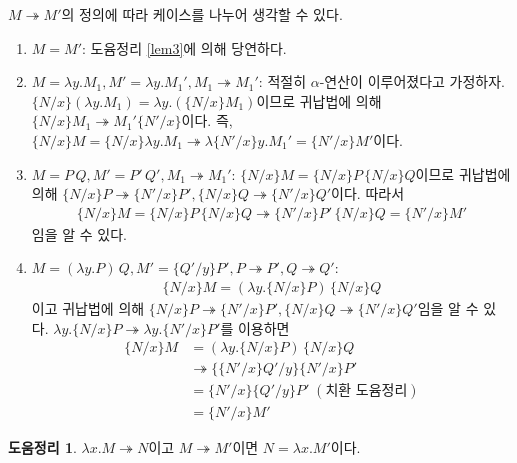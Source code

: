 \documentclass[b5paper, 11pt]{book}
\theoremstyle{definition}
\newtheorem{lem}[defn]{도움정리}
\newenvironment{pf*}{\pushQED{\qed}\pf}
{\popQED\endpf}
\begin{document}
\begin{pf*}
    $M \twoheadrightarrow M'$의 정의에 따라 케이스를 나누어 생각할 수 있다.
    \begin{enumerate}
        \item $M = M'$: 도윰정리 \ref{lem3}에 의해 당연하다.
        \item $M = \lambda y. M_1, M' = \lambda y. M_1', M_1 \twoheadrightarrow M_1'$: 적절히 $\alpha$-연산이 이루어졌다고 가정하자. $ \{N / x\}(\lambda y. M_1) = 
        \lambda y. (\{N / x\} M_1)$이므로 귀납법에 의해 $\{ N / x \} M_1 \twoheadrightarrow M_1' \{N' / x\}$이다.
        즉, $\{N / x\} M = \{N / x \} \lambda y. M_1 \twoheadrightarrow \lambda \{N' / x\} y. M_1' = \{N' / x\} M' $이다.
        \item $ M = P \, Q, M' = P' \, Q', M_1 \twoheadrightarrow M_1' $:
        $ \{N / x\}M = \{N / x \} P \, \{N / x\} Q$이므로 귀납법에 의해 $\{N / x\} P 
    \twoheadrightarrow \{N' / x \} P', \{N / x \} Q \twoheadrightarrow \{N' / x \} Q'$이다. 따라서 
        \begin{align*}
            \{N / x \} M = \{N / x \} P \, \{N / x\} Q
            \twoheadrightarrow \{N' / x \} P' \,  \{N / x \} Q
            = \{N' / x \} M'
        \end{align*} 임을 알 수 있다.
        \item $M = (\lambda y. P) \, Q, M' = \{Q' / y\} P' , P \twoheadrightarrow P' , Q \twoheadrightarrow Q'$:
        \begin{align*}
            \{N / x \} M = (\lambda y. \{N /x \} P) \, \{N /x \} Q 
        \end{align*}
        이고 귀납법에 의해 $ \{N / x\} P \twoheadrightarrow \{N' / x \} P', 
        \{N / x\} Q \twoheadrightarrow \{N' / x \} Q'$임을 알 수 있다. $\lambda y. \{N / x\} P 
        \twoheadrightarrow \lambda y. \{N' / x\} P' $를 이용하면
        \begin{align*}
            \{N / x\}M &= (\lambda y. \{N / x \} P )\, \{N / x\} Q \\ 
            &\twoheadrightarrow \{ \{N' / x\} Q' / y \} \{N' / x\} P' \\ 
            &= \{N' / x\}\{ Q' / y \} P' \; (\text{치환 도윰정리})\\ 
            &= \{N' / x\} M'
        \end{align*}
    \end{enumerate}
\end{pf*}
\begin{lem}
   $\lambda x. M \twoheadrightarrow N$이고 $M \twoheadrightarrow M'$이면
   $N = \lambda x.M'$이다.
\end{lem}
\end{document}
